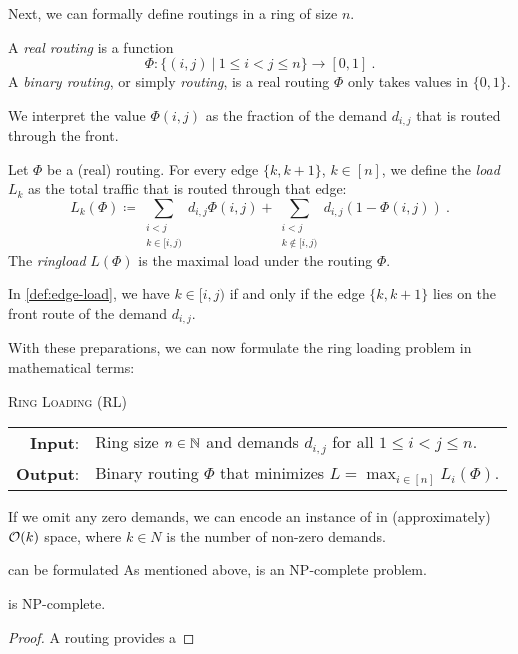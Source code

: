 Next, we can formally define routings in a ring of size $n$.
\begin{definition}[Routing]
	\label{def:routing}
	A \emph{real routing} is a function 
	\begin{equation}
		\Phi: \{(i, j)\ | \ 1 \leq i < j \leq n\} \rightarrow [0, 1] \ .
	\end{equation}
	A \emph{binary routing}, or simply \emph{routing}, is a real routing $\Phi$ only takes values in $\{0, 1\}$. 
\end{definition}
We interpret the value $\Phi(i, j)$ as the fraction of the demand $d_{i, j}$ that is routed through the front.

\begin{definition}
	\label{def:edge-load}
	Let $\Phi$ be a (real) routing.
	For every edge $\{k, k+1\}$, $k \in [n]$, we define the \emph{load} $L_k$ as the total traffic that is routed through that edge:
	\begin{equation}
		\label{eq:edge-load}
		L_k(\Phi) \coloneqq \sum_{\substack{i < j\\ k \in [i, j)}} d_{i, j} \Phi(i, j) + \sum_{\substack{i < j\\ k \notin [i, j)}} d_{i, j} (1 - \Phi(i, j)) \ .
	\end{equation}
	The \emph{ringload} $L(\Phi)$ is the maximal load under the routing $\Phi$.
\end{definition}
In \cref{def:edge-load}, we have $k \in [i, j)$ if and only if the edge $\{k, k+1\}$ lies on the front route of the demand $d_{i, j}$.


With these preparations, we can now formulate the ring loading problem in mathematical terms:
\begin{center}
	\begin{mdframed}
		\centering
		\textsc{Ring Loading} (\textsc{RL})\\[0.7em]
		\begin{tabular}{rl}
			{\bfseries Input}: & Ring size $n \in \mathbb{N}$ and demands $d_{i, j}$ for all $1 \leq i<j\leq n$.\\
			{\bfseries Output}: & Binary routing $\Phi$ that minimizes $L = \max_{i \in [n]} L_i(\Phi)$.
		\end{tabular}
	\end{mdframed}
\end{center}
If we omit any zero demands, we can encode an instance of \RL in (approximately) $\mathcal{O}(k)$ space, where $k \in N$ is the number of non-zero demands.

\RL can be formulated 
As mentioned above, \RL is an NP-complete problem.
\begin{theorem}
	\RL is NP-complete.
\end{theorem}
\begin{proof}
	A routing provides a 
\end{proof}



